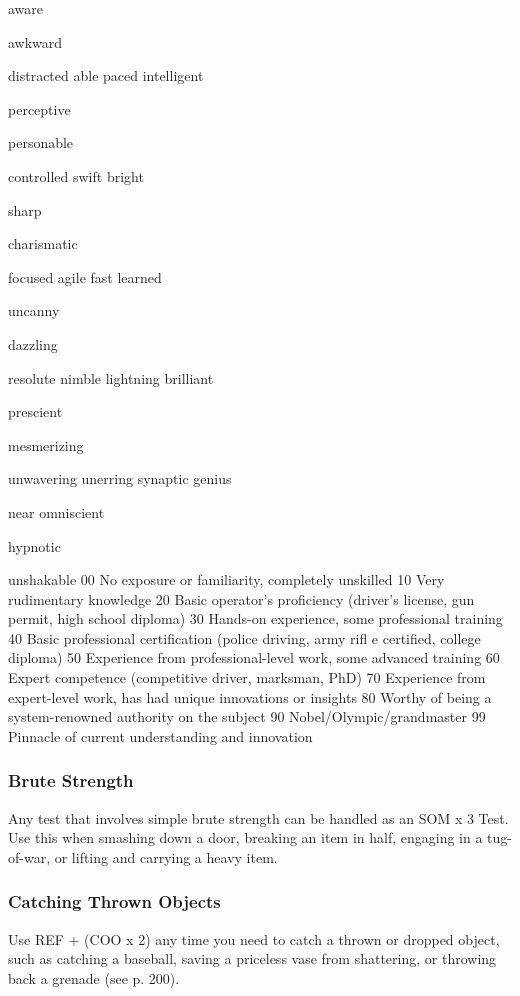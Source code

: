 aware

awkward

distracted
able
paced
intelligent

perceptive

personable

controlled
swift
bright

sharp

charismatic

focused
agile
fast
learned

uncanny

dazzling

resolute
nimble
lightning
brilliant

prescient

mesmerizing

unwavering
unerring
synaptic
genius

near omniscient

hypnotic

unshakable
00
No exposure or familiarity, completely unskilled
10
Very rudimentary knowledge
20
Basic operator's proficiency (driver's license, gun permit, 
high school diploma)
30
Hands-on experience, some professional training
40
Basic professional certification (police driving, army riﬂ e 
certified, college diploma)
50
Experience from professional-level work, some 
advanced training
60
Expert competence (competitive driver, marksman, PhD)
70
Experience from expert-level work, has had unique innovations
or insights
80
Worthy of being a system-renowned authority on 
the subject
90
Nobel/Olympic/grandmaster
99
Pinnacle of current understanding and innovation

\subsubsection{Brute Strength}

Any test that involves simple brute strength can be 
handled as an SOM x 3 Test. Use this when smashing 
down a door, breaking an item in half, engaging in a 
tug-of-war, or lifting and carrying a heavy item.

\subsubsection{Catching Thrown Objects}

Use REF + (COO x 2) any time you need to catch a 
thrown or dropped object, such as catching a baseball, 
saving a priceless vase from shattering, or throwing 
back a grenade (see p. 200).

